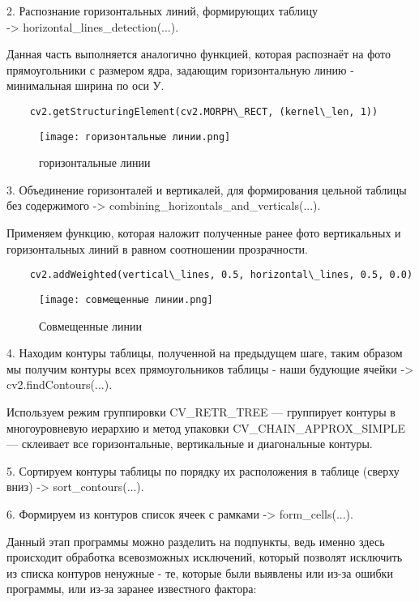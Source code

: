 \documentclass[a4paper, 12pt]{report}
\begin{document}
2.	Распознание горизонтальных линий, формирующих таблицу\\ -> horizontal\_lines\_detection(...).

\pagebreak
Данная часть выполняется аналогично функцией, которая распознаёт на фото прямоугольники с размером ядра, задающим горизонтальную линию - минимальная ширина по оси У.
\begin{lstlisting}
    cv2.getStructuringElement(cv2.MORPH\_RECT, (kernel\_len, 1))
\end{lstlisting}

\begin{figure}[ht]
    \centering
    \texttt{[image: горизонтальные линии.png]}
    \caption{горизонтальные линии}
    \label{fig:my_label}
\end{figure}

3. Объединение горизонталей и вертикалей, для формирования цельной таблицы без содержимого -> combining\_horizontals\_and\_verticals(...).

Применяем функцию, которая наложит полученные ранее фото вертикальных и горизонтальных линий в равном соотношении прозрачности.
\begin{lstlisting}
    cv2.addWeighted(vertical\_lines, 0.5, horizontal\_lines, 0.5, 0.0)
\end{lstlisting}

\begin{figure}[ht]
    \centering
    \texttt{[image: совмещенные линии.png]}
    \caption{Совмещенные линии}
    \label{fig:my_label}
\end{figure}

4.	Находим контуры таблицы, полученной на предыдущем шаге, таким образом мы получим контуры всех прямоугольников таблицы - наши будующие ячейки -> cv2.findContours(...).

Используем режим группировки CV\_RETR\_TREE — группирует контуры в многоуровневую иерархию и метод упаковки CV\_CHAIN\_APPROX\_SIMPLE — склеивает все горизонтальные, вертикальные и диагональные контуры.

5.	Сортируем контуры таблицы по порядку их расположения в таблице (сверху вниз) -> sort\_contours(...).

6.	Формируем из контуров список ячеек с рамками -> form\_cells(...).

Данный этап программы можно разделить на подпункты, ведь именно здесь происходит обработка всевозможных исключений, который позволят исключить из списка контуров ненужные - те, которые были выявлены или из-за ошибки программы, или из-за заранее известного фактора:
\end{document}
